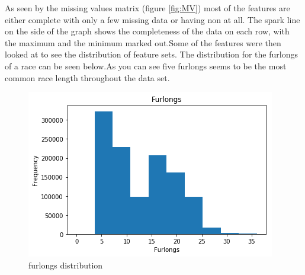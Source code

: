 As seen by the missing values matrix (figure \ref{fig:MV}) most of the features are either complete with only a few missing data or having non at all. The spark line on the side of the graph shows the completeness of the data on each row, with the maximum and the minimum marked out.Some of the features were then looked at to see the distribution of feature sets. The distribution for the furlongs of a race can be seen below.As you can see five furlongs seems to be the most common race length throughout the data set. 
\begin{figure}[h!]
  \centering
  \includegraphics[width = (\textwidth)/2]{furlongs.png}
  \caption{furlongs distribution}
  \label{fig:fur}
\end{figure}


